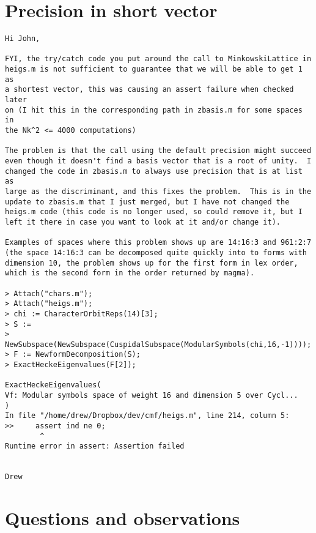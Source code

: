 \documentclass[11pt]{amsart}
\numberwithin{equation}{subsection}
\theoremstyle{definition}
\begin{document}
\section{Precision in short vector}

\begin{verbatim}
Hi John,

FYI, the try/catch code you put around the call to MinkowskiLattice in 
heigs.m is not sufficient to guarantee that we will be able to get 1 as 
a shortest vector, this was causing an assert failure when checked later 
on (I hit this in the corresponding path in zbasis.m for some spaces in 
the Nk^2 <= 4000 computations)

The problem is that the call using the default precision might succeed 
even though it doesn't find a basis vector that is a root of unity.  I 
changed the code in zbasis.m to always use precision that is at list as 
large as the discriminant, and this fixes the problem.  This is in the 
update to zbasis.m that I just merged, but I have not changed the 
heigs.m code (this code is no longer used, so could remove it, but I 
left it there in case you want to look at it and/or change it).

Examples of spaces where this problem shows up are 14:16:3 and 961:2:7 
(the space 14:16:3 can be decomposed quite quickly into to forms with 
dimension 10, the problem shows up for the first form in lex order, 
which is the second form in the order returned by magma).

> Attach("chars.m");
> Attach("heigs.m");
> chi := CharacterOrbitReps(14)[3];
> S := 
> NewSubspace(NewSubspace(CuspidalSubspace(ModularSymbols(chi,16,-1))));
> F := NewformDecomposition(S);
> ExactHeckeEigenvalues(F[2]);

ExactHeckeEigenvalues(
Vf: Modular symbols space of weight 16 and dimension 5 over Cycl...
)
In file "/home/drew/Dropbox/dev/cmf/heigs.m", line 214, column 5:
>>     assert ind ne 0;
        ^
Runtime error in assert: Assertion failed


Drew
\end{verbatim}

\section{Questions and observations}
\end{document}
